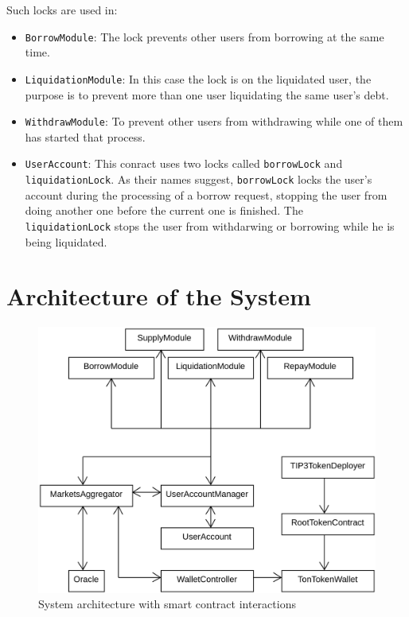 Such locks are used in:
\begin{itemize}
  \item \verb|BorrowModule|: The lock prevents other users from borrowing at the same time.
  \item \verb|LiquidationModule|: In this case the lock is on the liquidated user, the purpose is to prevent more than one user liquidating the same user's debt.
  \item \verb|WithdrawModule|: To prevent other users from withdrawing while one of them has started that process.
  \item \verb|UserAccount|: This conract uses two locks called \verb|borrowLock| and \\\verb|liquidationLock|. As their names suggest, \verb|borrowLock| locks the user's account during the processing of a borrow request, stopping the user from doing another one before the current one is finished. The \\\verb|liquidationLock| stops the user from withdarwing or borrowing while he is being liquidated.
\end{itemize}

\section{Architecture of the System}

\begin{figure}[h!]
  \includegraphics[width=\textwidth]{./assets/archi.png}
  \caption{System architecture with smart contract interactions}
  \label{fig:archi}
  \captionsetup[figure]{list=no} %
\end{figure}

